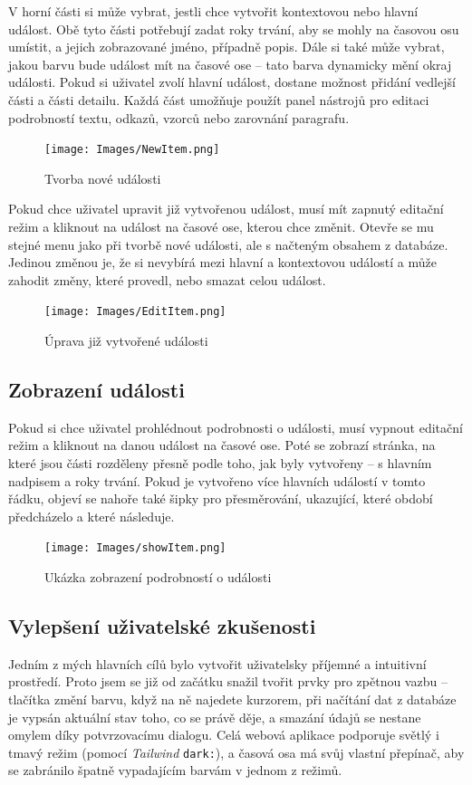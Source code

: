 V horní části si může vybrat, jestli chce vytvořit kontextovou nebo hlavní událost. Obě tyto části potřebují zadat roky trvání, aby se mohly na časovou osu umístit, a jejich zobrazované jméno, případně popis. Dále si také může vybrat, jakou barvu bude událost mít na časové ose – tato barva dynamicky mění okraj události. Pokud si uživatel zvolí hlavní událost, dostane možnost přidání vedlejší části a části detailu. Každá část umožňuje použít panel nástrojů pro editaci podrobností textu, odkazů, vzorců nebo zarovnání paragrafu. 

\begin{figure}[h]
    \centering
    \texttt{[image: Images/NewItem.png]}
    \caption{Tvorba nové události}
    \label{fig:NewItem}
\end{figure}

Pokud chce uživatel upravit již vytvořenou událost, musí mít zapnutý editační režim a kliknout na událost na časové ose, kterou chce změnit. Otevře se mu stejné menu jako při tvorbě nové události, ale s načteným obsahem z databáze. Jedinou změnou je, že si nevybírá mezi hlavní a kontextovou událostí a může zahodit změny, které provedl, nebo smazat celou událost.  

\begin{figure}[h]
    \centering
    \texttt{[image: Images/EditItem.png]}
    \caption{Úprava již vytvořené události}
    \label{fig:EditItem}
\end{figure}


\subsection{Zobrazení události}
Pokud si chce uživatel prohlédnout podrobnosti o události, musí vypnout editační režim a kliknout na danou událost na časové ose. Poté se zobrazí stránka, na které jsou části rozděleny přesně podle toho, jak byly vytvořeny – s hlavním nadpisem a roky trvání. Pokud je vytvořeno více hlavních událostí v tomto řádku, objeví se nahoře také šipky pro přesměrování, ukazující, které období předcházelo a které následuje. 

\begin{figure}[h]
    \centering
    \texttt{[image: Images/showItem.png]}
    \caption{Ukázka zobrazení podrobností o události}
    \label{fig:showItem}
\end{figure}


\subsection{Vylepšení uživatelské zkušenosti}
Jedním z mých hlavních cílů bylo vytvořit uživatelsky příjemné a intuitivní prostředí. Proto jsem se již od začátku snažil tvořit prvky pro zpětnou vazbu – tlačítka změní barvu, když na ně najedete kurzorem, při načítání dat z databáze je vypsán aktuální stav toho, co se právě děje, a smazání údajů se nestane omylem díky potvrzovacímu dialogu. Celá webová aplikace podporuje světlý i tmavý režim (pomocí \textit{Tailwind} \texttt{dark:}), a časová osa má svůj vlastní přepínač, aby se zabránilo špatně vypadajícím barvám v jednom z režimů. 

